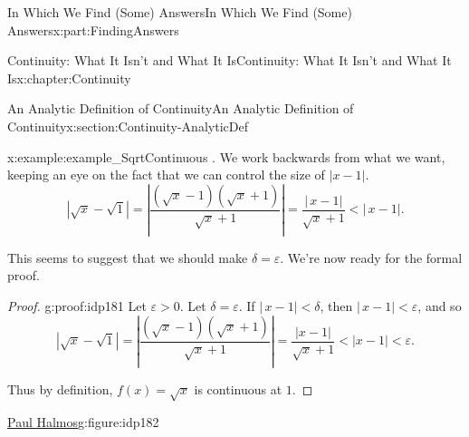 \documentclass[oneside,10pt,]{book}
\numberwithin{equation}{section}
\newcommand{\abs}[1]{\left|#1\right|}
\newcommand{\eps}{\varepsilon}
\newcommand{\lt}{<}
\begin{document}
\begin{partptx}{In Which We Find (Some) Answers}{}{In Which We Find (Some) Answers}{}{}{x:part:FindingAnswers}
\begin{chapterptx}{Continuity: What It Isn't and What It Is}{}{Continuity: What It Isn't and What It Is}{}{}{x:chapter:Continuity}
\begin{sectionptx}{An Analytic Definition of Continuity}{}{An Analytic Definition of Continuity}{}{}{x:section:Continuity-AnalyticDef}
\begin{example}{}{x:example:example_SqrtContinuous}
\delta\).  We work backwards from what we want, keeping an eye on the fact that we can control the size of \(\abs{x-1}\).%
\begin{equation*}
|\sqrt{x}-\sqrt{1}|=|\frac{\left(\sqrt{x}-1\right)\left(\sqrt{x}+1\right)}{\sqrt{x}+1}|=\frac{|\,x-1|}{\sqrt{x}+1}\lt |\,x-1|\text{.}
\end{equation*}
%
\par
This seems to suggest that we should make \(\delta=\eps\). We're now ready for the formal proof.%
\end{example}
\begin{proof}{}{g:proof:idp181}
Let \(\eps>0\). Let \(\delta=\eps\). If \(|\,x-1|\lt \delta\), then \(|\,x-1|\lt \eps\), and so%
\begin{equation*}
\abs{\sqrt{x}-\sqrt{1}}=|\frac{\left(\sqrt{x}-1\right)\left(\sqrt{x}+1\right)}{ \sqrt{x}+1}|=\frac{|x-1|}{\sqrt{x}+1}\lt \abs{x-1}\lt \eps\text{.}
\end{equation*}
%
\par
Thus by definition, \(f(x)=\sqrt{x}\) is continuous at \(1\).%
\end{proof}
\begin{figureptx}{\href{https://mathshistory.st-andrews.ac.uk/Biographies/Halmos/}{Paul Halmos}\protect\footnotemark{}}{g:figure:idp182}{}%
%
\begin{image}{0.325}{0.35}{0.325}%

\end{image}
\end{figureptx}
\end{sectionptx}
\end{chapterptx}
\end{partptx}
\end{document}
